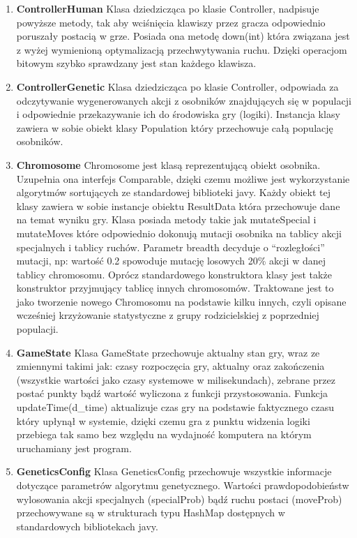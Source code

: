 \begin{par}
\begin{enumerate}
	\item{\bf ControllerHuman }\newline
	Klasa dziedzicząca po klasie Controller, nadpisuje powyższe metody, tak aby wciśnięcia klawiszy przez gracza odpowiednio poruszały postacią w grze. Posiada ona metodę down(int) która związana jest z wyżej wymienioną optymalizacją przechwytywania ruchu. Dzięki operacjom bitowym szybko sprawdzany jest stan każdego klawisza.
	\item{\bf ControllerGenetic }\newline
	Klasa dziedzicząca po klasie Controller, odpowiada za odczytywanie wygenerowanych akcji z osobników znajdujących się w populacji i odpowiednie przekazywanie ich do środowiska gry (logiki). Instancja klasy zawiera w sobie obiekt klasy Population który przechowuje całą populację osobników.
	\item{\bf Chromosome }\newline
	Chromosome jest klasą reprezentującą obiekt osobnika. Uzupełnia ona interfejs Comparable, dzięki czemu możliwe jest wykorzystanie algorytmów sortujących ze standardowej biblioteki javy. Każdy obiekt tej klasy zawiera w sobie instancje obiektu ResultData która przechowuje dane na temat wyniku gry. Klasa posiada metody takie jak mutateSpecial i mutateMoves które odpowiednio dokonują mutacji osobnika na tablicy akcji specjalnych i tablicy ruchów. Parametr breadth decyduje o ``rozległości'' mutacji, np: wartość 0.2 spowoduje mutację losowych 20\% akcji w danej tablicy chromosomu. Oprócz standardowego konstruktora klasy jest także konstruktor przyjmujący tablicę innych chromosomów. Traktowane jest to jako tworzenie nowego Chromosomu na podstawie kilku innych, czyli opisane wcześniej krzyżowanie statystyczne z grupy rodzicielskiej z poprzedniej populacji. 
	\item{\bf GameState }\newline
	Klasa GameState przechowuje aktualny stan gry, wraz ze zmiennymi takimi jak: czasy rozpoczęcia gry, aktualny oraz zakończenia (wszystkie wartości jako czasy systemowe w milisekundach), zebrane przez postać punkty bądź wartość wyliczona z funkcji przystosowania. Funkcja updateTime(d\_time) aktualizuje czas gry na podstawie faktycznego czasu który upłynął w systemie, dzięki czemu gra z punktu widzenia logiki przebiega tak samo bez względu na wydajność komputera na którym uruchamiany jest program.
	\item{\bf GeneticsConfig }\newline
	Klasa GeneticsConfig przechowuje wszystkie informacje dotyczące parametrów algorytmu genetycznego. Wartości prawdopodobieństw wylosowania akcji specjalnych (specialProb) bądź ruchu postaci (moveProb) przechowywane są w strukturach typu HashMap dostępnych w standardowych bibliotekach javy.

\end{enumerate}
\end{par}
